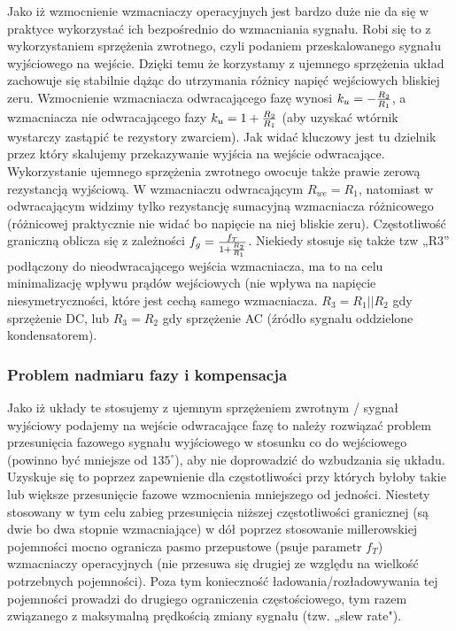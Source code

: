 \documentclass{pdfBooklets}
\begin{document}
Jako iż wzmocnienie wzmacniaczy operacyjnych jest bardzo duże nie da się w praktyce wykorzystać ich bezpośrednio do wzmacniania sygnału.
Robi się to z wykorzystaniem sprzężenia zwrotnego, czyli podaniem przeskalowanego sygnału wyjściowego na wejście.
Dzięki temu że korzystamy z ujemnego sprzężenia układ zachowuje się stabilnie dążąc do utrzymania różnicy napięć wejściowych bliskiej zeru.
Wzmocnienie wzmacniacza odwracającego fazę wynosi $k_u = - {R_2 \over R_1}$, a wzmacniacza nie odwracającego fazy $k_u = 1 + {R_2 \over R_1}$ (aby uzyskać wtórnik wystarczy zastąpić te rezystory zwarciem).
Jak widać kluczowy jest tu dzielnik przez który skalujemy przekazywanie wyjścia na wejście odwracające.
Wykorzystanie ujemnego sprzężenia zwrotnego owocuje także prawie zerową rezystancją wyjściową.
W wzmacniaczu odwracającym $R_{we} = R_1$, natomiast w odwracającym widzimy tylko rezystancję sumacyjną wzmacniacza różnicowego (różnicowej praktycznie nie widać bo napięcie na niej bliskie zeru).
Częstotliwość graniczną oblicza się z zależności $f_g = {f_T \over 1 + {R_2 \over R_1}}$.
Niekiedy stosuje się także tzw „R3” podłączony do nieodwracającego wejścia wzmacniacza, ma to na celu minimalizację wpływu prądów wejściowych (nie wpływa na napięcie niesymetryczności, które jest cechą samego wzmacniacza.
$R_3 = R_1 || R_2$ gdy sprzężenie DC, lub $R_3 = R_2$ gdy sprzężenie AC (źródło sygnału oddzielone kondensatorem).

\subsubsection{Problem nadmiaru fazy i kompensacja}
Jako iż układy te stosujemy z ujemnym sprzężeniem zwrotnym / sygnał wyjściowy podajemy na wejście odwracające fazę to należy rozwiązać problem przesunięcia fazowego sygnału wyjściowego w stosunku co do wejściowego (powinno być mniejsze od $135^{\circ}$), aby nie doprowadzić do wzbudzania się układu.
Uzyskuje się to poprzez zapewnienie dla częstotliwości przy których byłoby takie lub większe przesunięcie fazowe wzmocnienia mniejszego od jedności.
Niestety stosowany w tym celu zabieg przesunięcia niższej częstotliwości granicznej (są dwie bo dwa stopnie wzmacniające) w dół poprzez stosowanie millerowskiej pojemności mocno ogranicza pasmo przepustowe (psuje parametr $f_T$) wzmacniaczy operacyjnych (nie przesuwa się drugiej ze względu na wielkość potrzebnych pojemności).
Poza tym konieczność ładowania/rozładowywania tej pojemności prowadzi do drugiego ograniczenia częstościowego, tym razem związanego z maksymalną prędkością zmiany sygnału (tzw. „slew rate").
\end{document}
